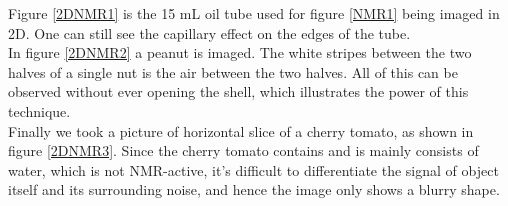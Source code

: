 Figure \ref{2DNMR1} is the 15 mL oil tube used for figure \ref{NMR1} being imaged in 2D. One can still see the capillary effect on the edges of the tube. \\
In figure \ref{2DNMR2} a peanut is imaged. The white stripes between the two halves of a single nut is the air between the two halves. All of this can be observed without ever opening the shell, which illustrates the power of this technique. \\
Finally we took a picture of horizontal slice of a cherry tomato, as shown in figure \ref{2DNMR3}. Since the cherry tomato contains and is mainly consists of water, which is not NMR-active, it's difficult to differentiate the signal of object itself and its surrounding noise, and hence the image only shows a blurry shape.\\